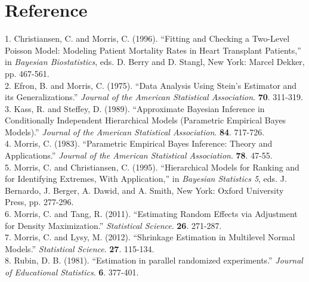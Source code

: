 \documentclass[article]{jss}
\begin{document}
\section[Reference]{Reference}
1. Christiansen, C. and Morris, C. (1996). ``Fitting and Checking a Two-Level Poisson Model: Modeling Patient Mortality Rates in Heart Transplant Patients,'' in \emph{Bayesian Biostatistics}, eds. D. Berry and D. Stangl, New York: Marcel Dekker, pp. 467-561.
\\

2. Efron, B. and Morris, C. (1975). ``Data Analysis Using Stein's Estimator and its Generalizations.'' \emph{Journal of the American Statistical Association}. \textbf{70}. 311-319.
\\

3. Kass, R. and Steffey, D. (1989). ``Approximate Bayesian Inference in Conditionally Independent Hierarchical Models (Parametric
Empirical Bayes Models).'' \emph{Journal of the American Statistical Association}. \textbf{84}. 717-726.
\\

4. Morris, C. (1983). ``Parametric Empirical Bayes Inference: Theory and Applications.'' \emph{Journal of the American Statistical Association}. \textbf{78}. 47-55.
\\

5. Morris, C. and Christiansen, C. (1995). ``Hierarchical Models for Ranking and for Identifying Extremes, With Application,'' in \emph{Bayesian Statistics 5}, eds. J. Bernardo, J. Berger, A. Dawid, and A. Smith, New York: Oxford University Press, pp. 277-296.
\\

6. Morris, C. and Tang, R. (2011). ``Estimating Random Effects via Adjustment for Density Maximization.'' \emph{Statistical Science}. \textbf{26}. 271-287.
\\

7. Morris, C. and Lysy, M. (2012). ``Shrinkage Estimation in Multilevel Normal Models.'' \emph{Statistical Science}. \textbf{27}. 115-134.
\\

8. Rubin, D. B. (1981). ``Estimation in parallel randomized
  experiments.'' \emph{Journal of Educational Statistics}. \textbf{6}. 377-401.
\\
\end{document}
